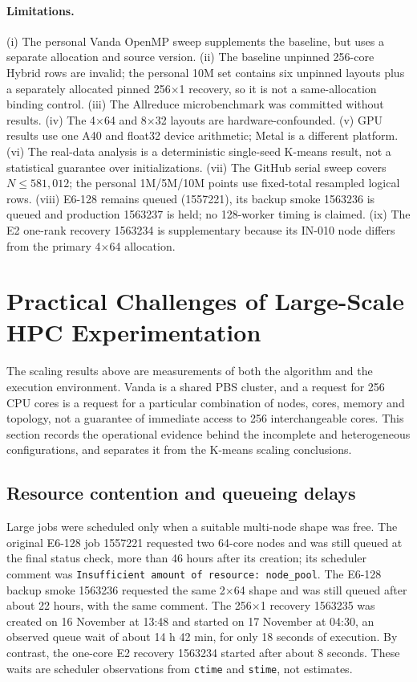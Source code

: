 \documentclass[10pt,a4paper]{article}
\newcommand{\code}[1]{\texttt{#1}}
\begin{document}
\paragraph{Limitations.}
(i) The personal Vanda OpenMP sweep supplements the baseline, but uses a separate allocation and source version. (ii) The baseline unpinned 256-core Hybrid rows are invalid; the personal 10M set contains six unpinned layouts plus a separately allocated pinned 256$\times$1 recovery, so it is not a same-allocation binding control. (iii) The Allreduce microbenchmark was committed without results. (iv) The 4$\times$64 and 8$\times$32 layouts are hardware-confounded. (v) GPU results use one A40 and float32 device arithmetic; Metal is a different platform. (vi) The real-data analysis is a deterministic single-seed K-means result, not a statistical guarantee over initializations. (vii) The GitHub serial sweep covers $N\le581{,}012$; the personal 1M/5M/10M points use fixed-total resampled logical rows. (viii) E6-128 remains queued (1557221), its backup smoke 1563236 is queued and production 1563237 is held; no 128-worker timing is claimed. (ix) The E2 one-rank recovery 1563234 is supplementary because its IN-010 node differs from the primary 4$\times$64 allocation.

\section{Practical Challenges of Large-Scale HPC Experimentation}

The scaling results above are measurements of both the algorithm and the
execution environment. Vanda is a shared PBS cluster, and a request for 256
CPU cores is a request for a particular combination of nodes, cores, memory
and topology, not a guarantee of immediate access to 256 interchangeable
cores. This section records the operational evidence behind the incomplete
and heterogeneous configurations, and separates it from the K-means scaling
conclusions.

\subsection{Resource contention and queueing delays}
Large jobs were scheduled only when a suitable multi-node shape was free.
The original E6-128 job 1557221 requested two 64-core nodes and was still
queued at the final status check, more than 46 hours after its creation; its
scheduler comment was \code{Insufficient amount of resource: node\_pool}. The
E6-128 backup smoke 1563236 requested the same 2$\times$64 shape and was still
queued after about 22 hours, with the same comment. The 256$\times$1 recovery
1563235 was created on 16 November at 13:48 and started on 17 November at
04:30, an observed queue wait of about 14 h 42 min, for only 18 seconds of
execution. By contrast, the one-core E2 recovery 1563234 started after about
8 seconds. These waits are scheduler observations from \code{ctime} and
\code{stime}, not estimates.
\end{document}
